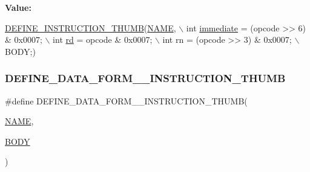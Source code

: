 {\bfseries Value\+:}
\begin{DoxyCode}
\mbox{\hyperlink{isa-thumb_8c_aca0a4c9b536fe9f14f89105945cfeb3d}{DEFINE\_INSTRUCTION\_THUMB}}(\mbox{\hyperlink{inflate_8h_a164ea0159d5f0b5f12a646f25f99eceaa67bc2ced260a8e43805d2480a785d312}{NAME}}, \(\backslash\)
        \textcolor{keywordtype}{int} \mbox{\hyperlink{decoder-arm_8c_a8bc2501cb64b3bc9ac59754cfafb68d1}{immediate}} = (opcode >> 6) & 0x0007; \(\backslash\)
        int \mbox{\hyperlink{isa-arm_8c_a555541ce18ed9b5fad657a06b22cb465}{rd}} = opcode & 0x0007; \(\backslash\)
        int rn = (opcode >> 3) & 0x0007; \(\backslash\)
        BODY;)
\end{DoxyCode}
\mbox{\label{isa-thumb_8c_a9ff704d6520de5f2e4c9b1f73f69edce}} 
\subsubsection{\texorpdfstring{D\+E\+F\+I\+N\+E\+\_\+\+D\+A\+T\+A\+\_\+\+F\+O\+R\+M\+\_\+\_\+\+I\+N\+S\+T\+R\+U\+C\+T\+I\+O\+N\+\_\+\+T\+H\+U\+MB}{DEFINE\_DATA\_FORM\_3\_INSTRUCTION\_THUMB}}
{\footnotesize\ttfamily \#define D\+E\+F\+I\+N\+E\+\_\+\+D\+A\+T\+A\+\_\+\+F\+O\+R\+M\+\_\+\_\+\+I\+N\+S\+T\+R\+U\+C\+T\+I\+O\+N\+\_\+\+T\+H\+U\+MB(\begin{DoxyParamCaption}\item[{}]{\mbox{\hyperlink{inflate_8h_a164ea0159d5f0b5f12a646f25f99eceaa67bc2ced260a8e43805d2480a785d312}{N\+A\+ME}},  }\item[{}]{\mbox{\hyperlink{gzlog_8c_aa6bdf6a6d9916c343e1e17774d84a156}{B\+O\+DY}} }\end{DoxyParamCaption})}

